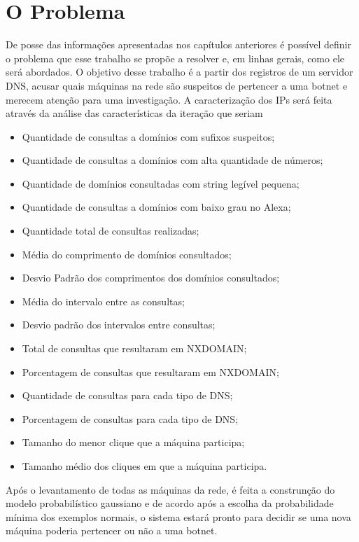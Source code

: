 \chapter{O Problema}

De posse das informações apresentadas nos capítulos anteriores é possível definir o problema que esse trabalho se propõe a resolver e, em linhas gerais, como ele será abordados.
O objetivo desse trabalho é a partir dos registros de um servidor DNS, acusar quais máquinas na rede são suspeitos de pertencer a uma botnet e merecem atenção para uma investigação. A caracterização dos IPs será feita através da análise das características da iteração que seriam

\begin{itemize}
\item Quantidade de consultas a domínios com sufixos suspeitos;
\item Quantidade de consultas a domínios com alta quantidade de números;
\item Quantidade de domínios consultadas com string legível pequena;
\item Quantidade de consultas a domínios com baixo grau no Alexa;
\item Quantidade total de consultas realizadas;
\item Média do comprimento de domínios consultados;
\item Desvio Padrão dos comprimentos dos domínios consultados;
\item Média do intervalo entre as consultas;
\item Desvio padrão dos intervalos entre consultas;
\item Total de consultas que resultaram em NXDOMAIN;
\item Porcentagem de consultas que resultaram em NXDOMAIN;
\item Quantidade de consultas para cada tipo de DNS;
\item Porcentagem de consultas para cada tipo de DNS;
\item Tamanho do menor clique que a máquina participa;
\item Tamanho médio dos cliques em que a máquina participa.
\end{itemize}

Após o levantamento de todas as máquinas da rede, é feita a construnção do modelo probabilístico gaussiano e de acordo após a escolha da probabilidade mínima dos exemplos normais, o sistema estará pronto para decidir se uma nova máquina poderia pertencer ou não a uma botnet.